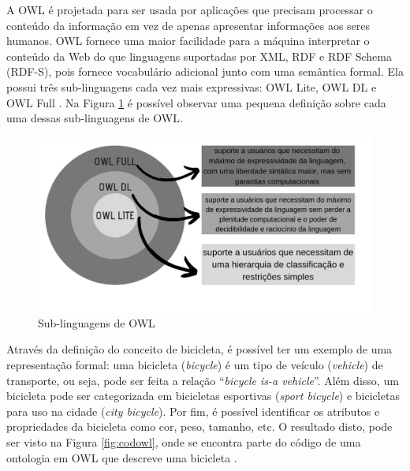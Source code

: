 \documentclass{bcc}
\begin{document}
A OWL é projetada para ser usada por aplicações que precisam processar o conteúdo da informação em vez de apenas apresentar informações aos seres humanos. OWL fornece uma maior facilidade para a máquina interpretar o conteúdo da Web do que linguagens suportadas por XML, RDF e RDF Schema (RDF-S), pois fornece vocabulário adicional junto com uma semântica formal. Ela possui três sub-linguagens cada vez mais expressivas: OWL Lite, OWL DL e OWL Full \cite{mcguinness}. Na Figura \ref{fig:owlsub} é possível observar uma pequena definição sobre cada uma dessas sub-linguagens de OWL.

\begin{figure}[H]
\centering
\includegraphics[width=.9\textwidth]{Figuras/owl_sub.png}
\caption{Sub-linguagens de OWL}
\label{fig:owlsub}
\end{figure}

Através da definição do conceito de bicicleta, é possível ter um exemplo de uma representação formal: uma bicicleta (\textit{bicycle}) é um tipo de veículo (\textit{vehicle}) de transporte, ou seja, pode ser feita a relação “\textit{bicycle is-a vehicle}”. Além disso, um bicicleta pode ser categorizada em bicicletas esportivas (\textit{sport bicycle}) e bicicletas para uso na cidade (\textit{city bicycle}). Por fim, é possível identificar os atributos e propriedades da bicicleta como cor, peso, tamanho, etc. O resultado disto, pode ser visto na Figura \ref{fig:codowl}, onde se encontra parte do código de uma ontologia em OWL que descreve uma bicicleta \cite{isotani2015}.
\end{document}
